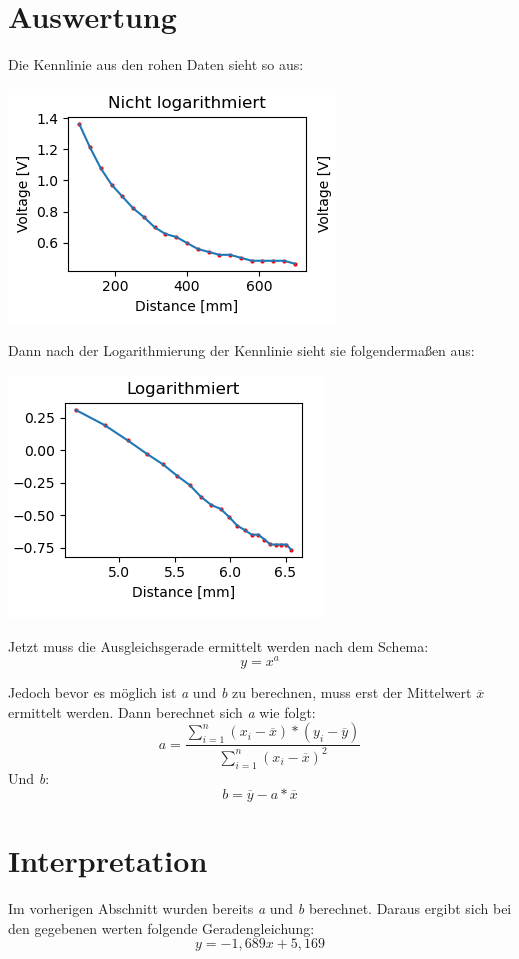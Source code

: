 \newpage
\section{Auswertung}
\label{chap:VERSUCH_2_AUSWERTUNG}
Die Kennlinie aus den rohen Daten sieht so aus:
	\begin{center}
		\includegraphics[scale=1.5]{media/dataV2.png}
	\end{center}
Dann nach der Logarithmierung der Kennlinie sieht sie folgendermaßen aus:
	\begin{center}
		\includegraphics[scale=1.5]{media/linReg.png}
	\end{center}


Jetzt muss die Ausgleichsgerade ermittelt werden nach dem Schema:
	\begin{equation}
  	y = x^a
	\end{equation}

Jedoch bevor es möglich ist \textit{a} und \textit{b} zu berechnen, muss erst der Mittelwert $\overline{x}$ ermittelt werden.\linebreak\linebreak
Dann berechnet sich \textit{a} wie folgt:
	\begin{equation}
	a = \dfrac{\sum\nolimits_{i=1}^n  (x_i - \overline{x}) * (y_i - \overline{y})  }{\sum\nolimits_{i=1}^n(x_i - \overline{x})^2}
	\end{equation}
Und \textit{b}:
	\begin{equation}
	b = \overline{y} - a * \overline{x}
	\end{equation}
	
	
	
\section{Interpretation}
\label{chap:VERSUCH_1_INTERPRETATION}
Im vorherigen Abschnitt wurden bereits \textit{a} und \textit{b} berechnet.
Daraus ergibt sich bei den gegebenen werten folgende Geradengleichung:
	\begin{equation*}
	y = -1,689x + 5,169
	\end{equation*}

